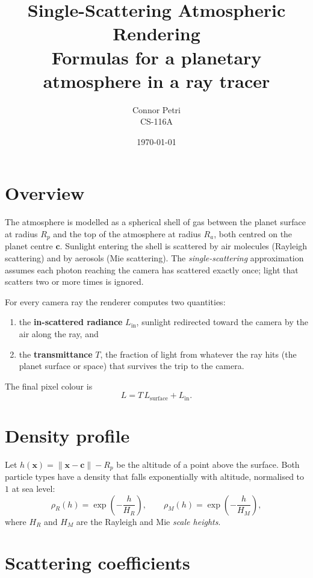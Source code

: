 \documentclass[11pt]{article}
\title{Single-Scattering Atmospheric Rendering\\
       \large Formulas for a planetary atmosphere in a ray tracer}
\author{Connor Petri\\CS-116A}
\date{\today}
\newcommand{\vect}[1]{\mathbf{#1}}
\newcommand{\Rp}{R_p}
\newcommand{\Ra}{R_a}
\begin{document}
\maketitle

\section{Overview}

The atmosphere is modelled as a spherical shell of gas between the planet
surface at radius $\Rp$ and the top of the atmosphere at radius $\Ra$, both
centred on the planet centre $\vect{c}$. Sunlight entering the shell is
scattered by air molecules (Rayleigh scattering) and by aerosols (Mie
scattering). The \emph{single-scattering} approximation assumes each photon
reaching the camera has scattered exactly once; light that scatters two or
more times is ignored.

For every camera ray the renderer computes two quantities:
\begin{enumerate}
  \item the \textbf{in-scattered radiance} $L_{\mathrm{in}}$, sunlight redirected
        toward the camera by the air along the ray, and
  \item the \textbf{transmittance} $T$, the fraction of light from whatever the
        ray hits (the planet surface or space) that survives the trip to the
        camera.
\end{enumerate}
The final pixel colour is
\begin{equation}
  L = T \, L_{\mathrm{surface}} + L_{\mathrm{in}} .
  \label{eq:composite}
\end{equation}

\section{Density profile}

Let $h(\vect{x}) = \lVert \vect{x} - \vect{c} \rVert - \Rp$ be the altitude of a
point above the surface. Both particle types have a density that falls
exponentially with altitude, normalised to $1$ at sea level:
\begin{equation}
  \rho_R(h) = \exp\!\left(-\frac{h}{H_R}\right), \qquad
  \rho_M(h) = \exp\!\left(-\frac{h}{H_M}\right),
  \label{eq:density}
\end{equation}
where $H_R$ and $H_M$ are the Rayleigh and Mie \emph{scale heights}.

\section{Scattering coefficients}
\end{document}
